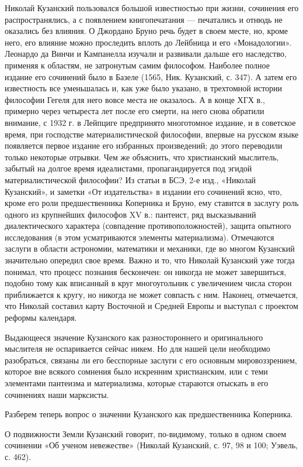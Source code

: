 Николай Кузанский пользовался большой известностью при жизни,
сочинения его распространялись, а с появлением книгопечатания ---
печатались и отнюдь не оказались без влияния. О Джордано Бруно речь
будет в своем месте, но, кроме него, его влияние можно проследить
вплоть до Лейбница и его «Монадологии». Леонардо да Винчи и Кампанелла
изучали и развивали дальше его наследство, применяя к областям, не
затронутым самим философом. Наиболее полное издание его сочинений было
в Базеле (1565, Ник. Кузанский, с. 347). А затем его известность все
уменьшалась и, как уже было указано, в трехтомной истории философии
Гегеля для него вовсе места не оказалось. А в конце ХГХ в., примерно
через четыреста лет после его смерти, на него снова обратили внимание,
с 1932 г. в Лейпциге предпринято многотомное издание, и в советское
время, при господстве материалистической философии, впервые на русском
языке появляется первое издание его избранных произведений; до этого
переводили только некоторые отрывки. Чем же объяснить, что
христианский мыслитель, забытый на долгое время идеалистами,
пропагандируется под эгидой материалистической философии? Из статьи в
БСЭ, 2-е изд., «Николай Кузанский», и заметки «От издательства» в
издании его сочинений ясно, что, кроме его роли предшественника
Коперника и Бруно, ему ставится в заслугу роль одного из крупнейших
философов XV в.: пантеист, ряд высказываний диалектического характера
(совпадение противоположностей), защита опытного исследования (в этом
усматриваются элементы материализма). Отмечаются заслуги в области
астрономии, математики и механики, где во многом Кузанский значительно
опередил свое время. Важно и то, что Николай Кузанский уже тогда
понимал, что процесс познания бесконечен: он никогда не может
завершиться, подобно тому как вписанный в круг многоугольник с
увеличением числа сторон приближается к кругу, но никогда не может
совпасть с ним. Наконец, отмечается, что Николай составил карту
Восточной и Средней Европы и выступал с проектом реформы календаря.

Выдающееся значение Кузанского как разностороннего и оригинального
мыслителя не оспаривается сейчас никем. Но для нашей цели необходимо
разобраться, связаны ли его бесспорные заслуги с его основным
мировоззрением, которое вне всякого сомнения было искренним
христианским, или с теми элементами пантеизма и материализма, которые
стараются отыскать в его сочинениях наши марксисты.

Разберем теперь вопрос о значении Кузанского как предшественника
Коперника.

О подвижности Земли Кузанский говорит, по-видимому, только в одном
своем сочинении «Об ученом невежестве» (Николай Кузанский, с. 97, 98 и
100; Уэвель, с. 462).

